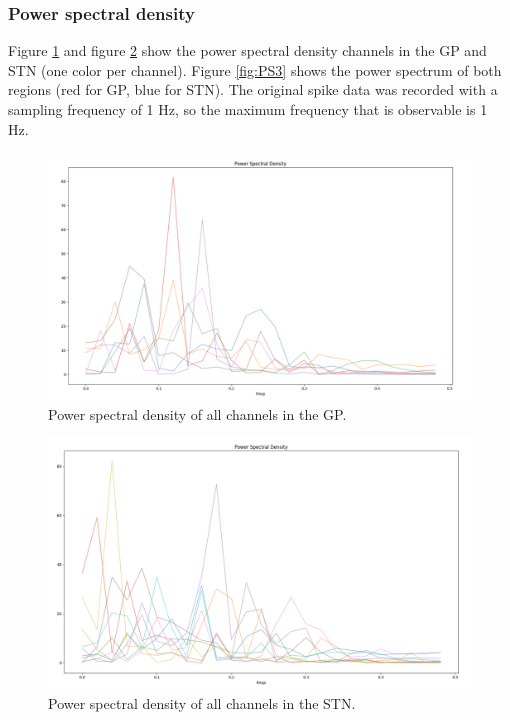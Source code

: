 \documentclass{article}
\begin{document}
\subsubsection{Power spectral density}

Figure \ref{fig:PS1} and figure \ref{fig:PS2} show the power spectral density channels in the GP and STN (one color per channel). 
Figure \ref{fig:PS3} shows the power spectrum of both regions (red for GP, blue for STN).
The original spike data was recorded with a sampling frequency of 1 Hz, so the maximum frequency that is observable is 1 Hz.

\begin{figure}[H]
    \centering
    \centerline{\includegraphics[width=1\textwidth]{images/spiking/powerSpec_gp.png}}
    \caption{Power spectral density of all channels in the GP.}
    \label{fig:PS1}
\end{figure}

\begin{figure}[H]
    \centering
    \centerline{\includegraphics[width=1\textwidth]{images/spiking/powerSpect_stn.png}}
    \caption{Power spectral density of all channels in the STN.}
    \label{fig:PS2}
\end{figure}
\end{document}
